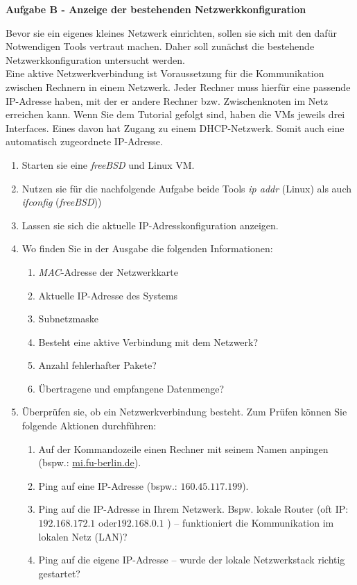 \documentclass[paper=a4,fontsize=11pt]{scrartcl}%
\begin{document}
\begin{center}
\Large{\textbf{Aufgabe B - Anzeige der bestehenden Netzwerkkonfiguration}}
\end{center}
Bevor sie ein eigenes kleines Netzwerk einrichten, sollen sie sich mit den dafür Notwendigen Tools vertraut machen. Daher soll zunächst die bestehende Netzwerkkonfiguration untersucht werden.\\
Eine aktive Netzwerkverbindung ist Voraussetzung für die Kommunikation zwischen Rechnern in einem Netzwerk. Jeder Rechner muss hierfür eine passende IP-Adresse haben, mit der er andere Rechner bzw. Zwischenknoten im Netz erreichen kann. Wenn Sie dem Tutorial gefolgt sind, haben die VMs jeweils drei Interfaces. Eines davon hat Zugang zu einem DHCP-Netzwerk. Somit auch eine automatisch zugeordnete IP-Adresse.
\begin{enumerate}
	\item Starten sie eine \emph{freeBSD} und Linux VM. 
	\item Nutzen sie für die nachfolgende Aufgabe beide Tools \emph{ip addr} (Linux) als auch \emph{ifconfig} (\emph{freeBSD}))
	\item Lassen sie sich die aktuelle IP-Adresskonfiguration anzeigen.
	\item Wo finden Sie in der Ausgabe die folgenden Informationen:
	\begin{enumerate}
		\item \emph{MAC}-Adresse der Netzwerkkarte
		\item Aktuelle IP-Adresse des Systems
		\item Subnetzmaske
		\item Besteht eine aktive Verbindung mit dem Netzwerk?
		\item Anzahl fehlerhafter Pakete?
		\item Übertragene und empfangene Datenmenge?
	\end{enumerate}
	\item Überprüfen sie, ob ein Netzwerkverbindung besteht. Zum Prüfen können Sie folgende Aktionen durchführen:
	\begin{enumerate}
		\item Auf der Kommandozeile einen Rechner mit seinem Namen anpingen (bspw.: \url{mi.fu-berlin.de}).
		\item Ping auf eine IP-Adresse (bspw.: $160.45.117.199$).
		\item Ping auf die IP-Adresse in Ihrem Netzwerk. Bspw. lokale Router (oft IP: $192.168.172.1$ oder$192.168.0.1$ ) -- funktioniert die Kommunikation im lokalen Netz (LAN)?
		\item Ping auf die eigene IP-Adresse -- wurde der lokale Netzwerkstack richtig gestartet?
	\end{enumerate}
\end{enumerate}
\end{document}
